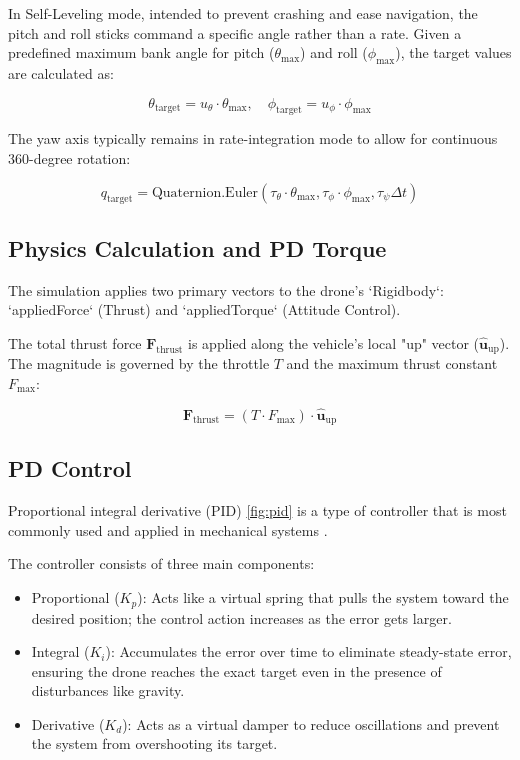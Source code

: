 In Self-Leveling mode, intended to prevent crashing and ease navigation, the pitch and roll sticks command a specific angle rather than a rate. Given a predefined maximum bank angle for pitch ($\theta_{\max}$) and roll ($\phi_{\max}$), the target values are calculated as:

$$\theta_{\text{target}} = u_\theta \cdot \theta_{\max}, \quad \phi_{\text{target}} = u_\phi \cdot \phi_{\max}$$

The yaw axis typically remains in rate-integration mode to allow for continuous 360-degree rotation:

$$
q_{\text{target}} =  \text{Quaternion.Euler}(\tau_\theta \cdot \theta_{\max}, \tau_\phi \cdot \phi_{\max}, \tau_\psi \Delta t)
$$


\subsection{Physics Calculation and PD Torque}

The simulation applies two primary vectors to the drone's `Rigidbody`: `appliedForce` (Thrust) and `appliedTorque` (Attitude Control).

The total thrust force $\mathbf{F}_{\text{thrust}}$ is applied along the vehicle's local "up" vector ($\hat{\mathbf{u}}_{\text{up}}$). The magnitude is governed by the throttle $T$ and the maximum thrust constant $F_{\max}$:

$$\mathbf{F}_{\text{thrust}} = (T \cdot F_{\max}) \cdot \hat{\mathbf{u}}_{\text{up}}$$


\subsection{PD Control}

Proportional integral derivative (PID) \cref{fig:pid} is a type of controller that is most commonly used and applied in mechanical systems \parencite{idrissi_review_2022}.

The controller consists of three main components:

\begin{itemize}
    \item Proportional ($K_p$): Acts like a virtual spring that pulls the system toward the desired position; the control action increases as the error gets larger.
    \item Integral ($K_i$): Accumulates the error over time to eliminate steady-state error, ensuring the drone reaches the exact target even in the presence of disturbances like gravity.
    \item Derivative ($K_d$): Acts as a virtual damper to reduce oscillations and prevent the system from overshooting its target.
\end{itemize}

